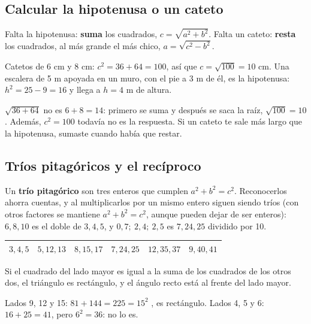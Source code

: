 \subsection{Calcular la hipotenusa o un cateto}
\begin{clave} Falta la hipotenusa: \textbf{suma} los cuadrados, $c = \sqrt{a^2 + b^2}$. Falta un cateto: \textbf{resta} los cuadrados, al más grande el más chico, $a = \sqrt{c^2 - b^2}$.\end{clave}
\begin{ejemplo} Catetos de 6 cm y 8 cm: $c^2 = 36 + 64 = 100$, así que $c = \sqrt{100} = 10$ cm. Una escalera de 5 m apoyada en un muro, con el pie a 3 m de él, es la hipotenusa: $h^2 = 25 - 9 = 16$ y llega a $h = 4$ m de altura.\end{ejemplo}
\begin{ojo} $\sqrt{36 + 64}$ no es $6 + 8 = 14$: primero se suma y después se saca la raíz, $\sqrt{100} = 10$. Además, $c^2 = 100$ todavía no es la respuesta. Si un cateto te sale más largo que la hipotenusa, sumaste cuando había que restar.\end{ojo}

\subsection{Tríos pitagóricos y el recíproco}
Un \textbf{trío pitagórico} son tres enteros que cumplen $a^2 + b^2 = c^2$. Reconocerlos ahorra cuentas, y al multiplicarlos por un mismo entero siguen siendo tríos (con otros factores se mantiene $a^2 + b^2 = c^2$, aunque pueden dejar de ser enteros): $6, 8, 10$ es el doble de $3, 4, 5$, y $0{,}7;\ 2{,}4;\ 2{,}5$ es $7, 24, 25$ dividido por 10.
\begin{center}\small
\begin{tabular}{cccccc}\toprule
$3, 4, 5$ & $5, 12, 13$ & $8, 15, 17$ & $7, 24, 25$ & $12, 35, 37$ & $9, 40, 41$\\\bottomrule
\end{tabular}\end{center}
\begin{clave} Si el cuadrado del lado mayor es igual a la suma de los cuadrados de los otros dos, el triángulo es rectángulo, y el ángulo recto está al frente del lado mayor.\end{clave}
\begin{ejemplo} Lados 9, 12 y 15: $81 + 144 = 225 = 15^2$ \checkmark, es rectángulo. Lados 4, 5 y 6: $16 + 25 = 41$, pero $6^2 = 36$: no lo es.\end{ejemplo}

